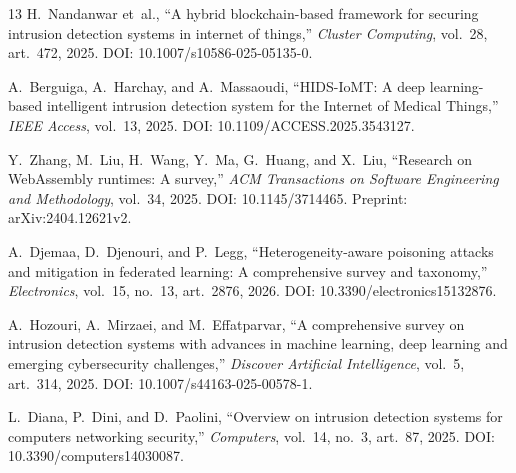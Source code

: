 \documentclass[11pt,a4paper]{article}
\begin{document}
\begin{thebibliography}{13}
H.~Nandanwar et~al.,
``A hybrid blockchain-based framework for securing intrusion detection
systems in internet of things,''
\emph{Cluster Computing}, vol.~28, art.~472, 2025.
DOI: 10.1007/s10586-025-05135-0.

A.~Berguiga, A.~Harchay, and A.~Massaoudi,
``HIDS-IoMT: A deep learning-based intelligent intrusion detection system
for the Internet of Medical Things,''
\emph{IEEE Access}, vol.~13, 2025.
DOI: 10.1109/ACCESS.2025.3543127.

Y.~Zhang, M.~Liu, H.~Wang, Y.~Ma, G.~Huang, and X.~Liu,
``Research on WebAssembly runtimes: A survey,''
\emph{ACM Transactions on Software Engineering and Methodology}, vol.~34,
2025. DOI: 10.1145/3714465. Preprint: arXiv:2404.12621v2.

A.~Djemaa, D.~Djenouri, and P.~Legg,
``Heterogeneity-aware poisoning attacks and mitigation in federated
learning: A comprehensive survey and taxonomy,''
\emph{Electronics}, vol.~15, no.~13, art.~2876, 2026.
DOI: 10.3390/electronics15132876.

A.~Hozouri, A.~Mirzaei, and M.~Effatparvar,
``A comprehensive survey on intrusion detection systems with advances in
machine learning, deep learning and emerging cybersecurity challenges,''
\emph{Discover Artificial Intelligence}, vol.~5, art.~314, 2025.
DOI: 10.1007/s44163-025-00578-1.

L.~Diana, P.~Dini, and D.~Paolini,
``Overview on intrusion detection systems for computers networking
security,''
\emph{Computers}, vol.~14, no.~3, art.~87, 2025.
DOI: 10.3390/computers14030087.

\end{thebibliography}

\end{document}
